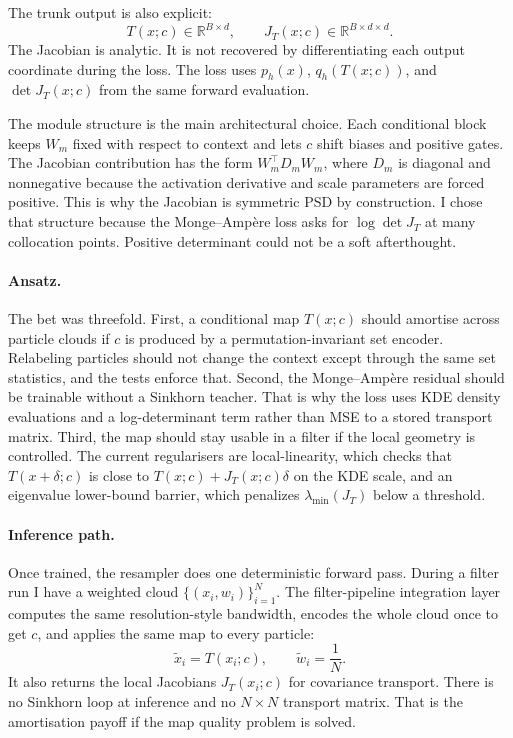 The trunk output is also explicit:
\begin{equation}
    T(x;c)\in\mathbb{R}^{B\times d},
    \qquad
    J_T(x;c)\in\mathbb{R}^{B\times d\times d}.
\end{equation}
The Jacobian is analytic. It is not recovered by differentiating each output coordinate during the loss. The loss uses $p_h(x)$, $q_h(T(x;c))$, and $\det J_T(x;c)$ from the same forward evaluation.

The module structure is the main architectural choice. Each conditional block keeps $W_m$ fixed with respect to context and lets $c$ shift biases and positive gates. The Jacobian contribution has the form $W_m^\top D_m W_m$, where $D_m$ is diagonal and nonnegative because the activation derivative and scale parameters are forced positive. This is why the Jacobian is symmetric PSD by construction. I chose that structure because the Monge--Amp\`ere loss asks for $\log\det J_T$ at many collocation points. Positive determinant could not be a soft afterthought.

\paragraph{Ansatz.}
The bet was threefold. First, a conditional map $T(x;c)$ should amortise across particle clouds if $c$ is produced by a permutation-invariant set encoder. Relabeling particles should not change the context except through the same set statistics, and the tests enforce that. Second, the Monge--Amp\`ere residual should be trainable without a Sinkhorn teacher. That is why the loss uses KDE density evaluations and a log-determinant term rather than MSE to a stored transport matrix. Third, the map should stay usable in a filter if the local geometry is controlled. The current regularisers are local-linearity, which checks that $T(x+\delta;c)$ is close to $T(x;c)+J_T(x;c)\delta$ on the KDE scale, and an eigenvalue lower-bound barrier, which penalizes $\lambda_{\min}(J_T)$ below a threshold.

\paragraph{Inference path.}
Once trained, the resampler does one deterministic forward pass. During a filter run I have a weighted cloud $\{(x_i,w_i)\}_{i=1}^N$. The filter-pipeline integration layer computes the same resolution-style bandwidth, encodes the whole cloud once to get $c$, and applies the same map to every particle:
\begin{equation}
    \tilde{x}_i = T(x_i;c), \qquad \tilde{w}_i = \frac{1}{N}.
\end{equation}
It also returns the local Jacobians $J_T(x_i;c)$ for covariance transport. There is no Sinkhorn loop at inference and no $N\times N$ transport matrix. That is the amortisation payoff if the map quality problem is solved.

